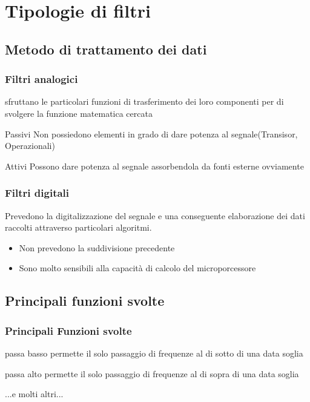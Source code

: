 	\section{Tipologie di filtri} %
	\label{sec:tipologie_costruttive_di_filtri}
		\subsection{Metodo di trattamento dei dati} %
		\label{sub:metodo_di_trattamento_dei_dati}

		\begin{frame}[c]\frametitle{Filtri analogici}
		    
				sfruttano le particolari funzioni di trasferimento dei loro componenti per di svolgere la funzione matematica cercata
				\pause
				\begin{block}{Passivi}
					Non possiedono elementi in grado di dare potenza al segnale(Transisor, Operazionali)
				\end{block}
				\pause
				\begin{block}{Attivi}
					Possono dare potenza al segnale assorbendola da fonti esterne ovviamente
				\end{block}
		
		\end{frame}

		\begin{frame}[c]\frametitle{Filtri digitali}

			Prevedono la digitalizzazione del segnale e una conseguente elaborazione dei dati raccolti attraverso particolari algoritmi.
			\begin{itemize}
				\pause
				\item Non prevedono la suddivisione precedente
				\pause
				\item Sono molto sensibili alla capacità di calcolo del microporcessore
			\end{itemize}

		\end{frame}
		

		\subsection{Principali funzioni svolte} %
		\label{sub:principali_funzioni_svolte}

		\begin{frame}[c]\frametitle{Principali Funzioni svolte}	
		\begin{block}{passa basso}
		    	permette il solo passaggio di frequenze al di sotto di una data soglia
		\end{block}
		\pause
		\begin{block}{passa alto}
				permette il solo passaggio di frequenze al di sopra di una data soglia 
		\end{block}
		\pause
		\begin{center}
		...e molti altri...
		\end{center}
		
		\end{frame}


